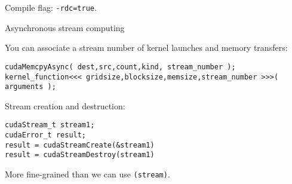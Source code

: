 Compile flag: \lstinline[language=bash]{-rdc=true}.

 {Asynchronous stream computing}

You can associate a stream number of kernel launches and memory transfers:
\begin{lstlisting}
cudaMemcpyAsync( dest,src,count,kind, stream_number );
kernel_function<<< gridsize,blocksize,memsize,stream_number >>>( arguments );
\end{lstlisting}

Stream creation and destruction:
\begin{lstlisting}
cudaStream_t stream1;
cudaError_t result;
result = cudaStreamCreate(&stream1)
result = cudaStreamDestroy(stream1)
\end{lstlisting}

More fine-grained than 
we can use \lstinline{(stream)}.
